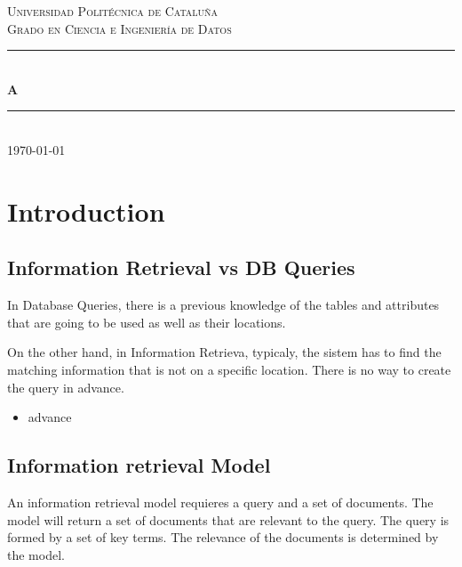 \documentclass{article}
\begin{document}
\begin{titlepage}
    \newcommand{\HRule}{\rule{\linewidth}{0.5mm}}
    
    \center %
    \textsc{\LARGE Universidad Politécnica de Cataluña}\\[1.5cm]
    \textsc{\Large Grado en Ciencia e Ingeniería de Datos}\\[0.5cm]
    \HRule\\[0.4cm]
    {\huge\bfseries A}\\[0.4cm]
    \HRule\\[1.5cm]
    \vfill
    {\large\today}
\end{titlepage}

\newpage
\tableofcontents
\newpage

\fancyfoot{} %

\section{Introduction}

\subsection{Information Retrieval vs DB Queries}
In Database Queries, there is a previous knowledge of the tables and attributes that are going to be used as well as their locations.

On the other hand, in Information Retrieva, typicaly, the sistem has to find the matching information that is not on a specific location. There is no way to create the query in advance.

\begin{itemize}
    \item advance
\end{itemize}

\subsection{Information retrieval Model}
An information retrieval model requieres a query and a set of documents. The model will return a set of documents that are relevant to the query. The query is formed by a set of key terms. The relevance of the documents is determined by the model.
\end{document}
